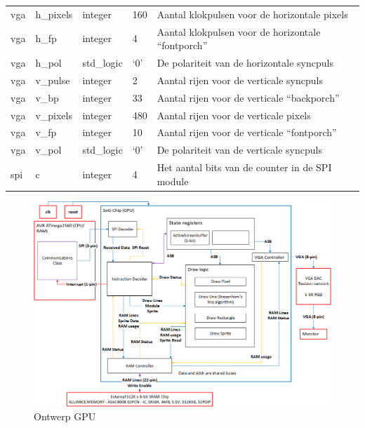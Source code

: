 \documentclass{scrartcl} %
\begin{document}
\begin{table}[H]
\begin{tabular}{l l l l l}
	vga & h\_pixels & integer & 160 & Aantal klokpulsen voor de horizontale pixels \\ 
	vga & h\_fp & integer & 4 & Aantal klokpulsen voor de horizontale “fontporch” \\ 
	vga & h\_pol & std\_logic & ‘0’ & De polariteit van de horizontale syncpuls\\ 
	vga & v\_pulse & integer & 2 & Aantal rijen voor de verticale syncpuls\\ 
	vga & v\_bp & integer & 33 & Aantal rijen voor de verticale “backporch” \\ 
	vga & v\_pixels & integer & 480 & Aantal rijen voor de verticale pixels\\ 
	vga & v\_fp & integer & 10 & Aantal rijen voor de verticale “fontporch” \\ 
	vga & v\_pol & std\_logic & ‘0’ & De polariteit van de verticale syncpuls\\ 
	spi & c & integer & 4 & Het aantal bits van de counter in de SPI module\\
  	\hline
\end{tabular}
\end{table}
\begin{figure}[H]
\centering
	\includegraphics[scale=0.9, angle=90]{resource/systeemdrawing-detail.png}
	\caption{Ontwerp GPU}
	\label{fig:Blokschema GPU}
\end{figure}


\end{document}
